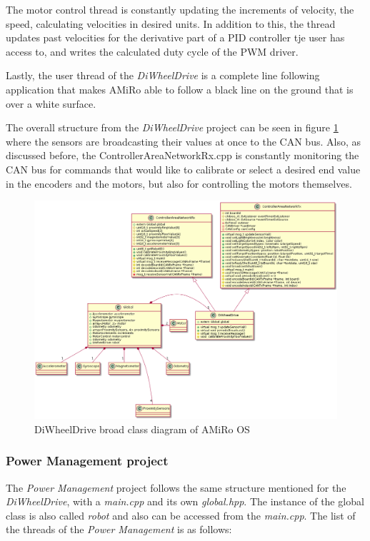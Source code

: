 \documentclass[12pt]{report}%
\begin{document}
The motor control thread is constantly updating the increments of velocity, the speed, calculating velocities in desired units. In addition to this, the thread updates past velocities for the derivative part of a PID controller tje user has access to, and writes the calculated duty cycle of the PWM driver.

Lastly, the user thread of the \textit{DiWheelDrive} is a complete line following application that makes AMiRo able to follow a black line on the ground that is over a white surface.

The overall structure from the \textit{DiWheelDrive} project can be seen in figure \ref{fig:DWDclassOS} where the sensors are broadcasting their values at once to the CAN bus. Also, as discussed before, the ControllerAreaNetworkRx.cpp is constantly monitoring the CAN bus for commands that would like to calibrate or select a desired end value in the encoders and the motors, but also for controlling the motors themselves.

\begin{figure}[ht]
	\centering
	\includegraphics[width=\textwidth]{DWDclass_OS}
    \caption{DiWheelDrive broad class diagram of AMiRo OS}
    \label{fig:DWDclassOS}
\end{figure}

\subsubsection{Power Management project}
The \textit{Power Management} project follows the same structure mentioned for the \textit{DiWheelDrive}, with a \textit{main.cpp} and its own \textit{global.hpp}. The instance of the global class is also called \textit{robot} and also can be accessed from the \textit{main.cpp}. The list of the threads of the \textit{Power Management} is as follows:
\end{document}
